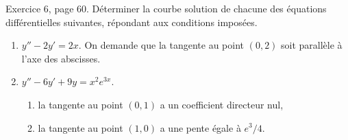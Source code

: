 \begin{exercice}\label{exoEquaDiff0013}

Exercice 6, page 60. Déterminer la courbe solution de chacune des équations différentielles suivantes, répondant aux conditions imposées.
\begin{enumerate}

\item
$y''-2y'=2x$. On demande que la tangente au point $(0,2)$ soit parallèle à l'axe des abscisses.

\item
$y''-6y'+9y=x^2 e^{3x}$.
\begin{enumerate}

\item
la tangente au point $(0,1)$ a un coefficient directeur nul,
\item
la tangente au point $(1,0)$ a une pente égale à $e^3/4$.

\end{enumerate}

\end{enumerate}

\end{exercice}
